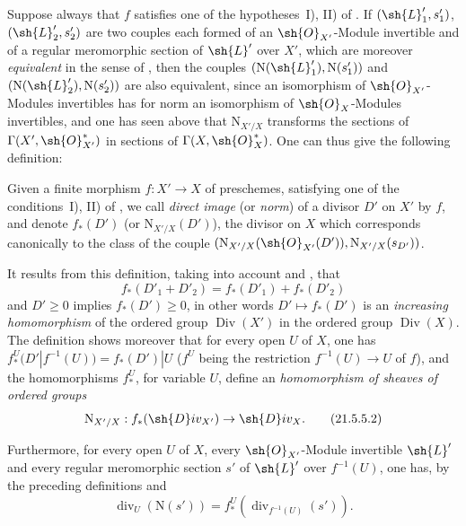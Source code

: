 \begin{env}[21.5.4]
\label{IV.21.5.4}
Suppose always that $f$ satisfies one of the hypotheses~I), II) of .
If $(\sh{L}'_1,s'_1)$, $(\sh{L}'_2,s'_2)$ are two couples each formed of an $\sh{O}_{X'}$-Module invertible and of a regular meromorphic section of $\sh{L}'$ over $X'$, which are moreover \emph{equivalent} in the sense of , then the couples $(\mathrm{N}(\sh{L}'_1),\mathrm{N}(s'_1))$ and $(\mathrm{N}(\sh{L}'_2),\mathrm{N}(s'_2))$ are also equivalent, since an isomorphism of $\sh{O}_{X'}$-Modules invertibles has for norm an isomorphism of $\sh{O}_X$-Modules invertibles, and one has seen above that $\mathrm{N}_{X'/X}$ transforms the sections of $\Gamma(X',\sh{O}_{X'}^*)$ in sections of $\Gamma(X,\sh{O}_X^*)$.
One can thus give the following definition:
\end{env}

\begin{definition}[21.5.5]
\label{IV.21.5.5}
Given a finite morphism $f:X'\to X$ of preschemes, satisfying one of the conditions~I), II) of , we call \emph{direct image} (or \emph{norm}) of a divisor $D'$ on $X'$ by $f$, and denote $f_*(D')$ (or $\mathrm{N}_{X'/X}(D')$), the divisor on $X$ which corresponds canonically  to the class of the couple $(\mathrm{N}_{X'/X}(\sh{O}_{X'}(D')),\mathrm{N}_{X'/X}(s_{D'}))$.
\end{definition}

It results from this definition, taking into account  and , that
\[
\label{IV.21.5.5.1}
  f_*(D'_1+D'_2)=f_*(D'_1)+f_*(D'_2)
  \tag{21.5.5.1}
\]
and $D'\geq 0$ implies $f_*(D')\geq 0$, in other words $D'\mapsto f_*(D')$ is an \emph{increasing homomorphism} of the ordered group $\operatorname{Div}(X')$ in the ordered group $\operatorname{Div}(X)$.
The definition  shows moreover that for every open $U$ of $X$, one has $f_*^U(D'|f^{-1}(U))=f_*(D')|U$ ($f^U$ being the restriction $f^{-1}(U)\to U$ of $f$), and the homomorphisms $f_*^U$, for variable $U$, define an \emph{homomorphism of sheaves of ordered groups}
\[
\label{IV.21.5.5.2}
  \mathrm{N}_{X'/X}:f_*(\sh{D}iv_{X'})\to\sh{D}iv_X.
  \tag{21.5.5.2}
\]

Furthermore, for every open $U$ of $X$, every $\sh{O}_{X'}$-Module invertible $\sh{L}'$ and every regular meromorphic section $s'$ of $\sh{L}'$ over $f^{-1}(U)$, one has, by the preceding definitions and 
\[
\label{IV.21.5.5.3}
  \operatorname{div}_U(\mathrm{N}(s'))=f_*^U(\operatorname{div}_{f^{-1}(U)}(s')).
  \tag{21.5.5.3}
\]

